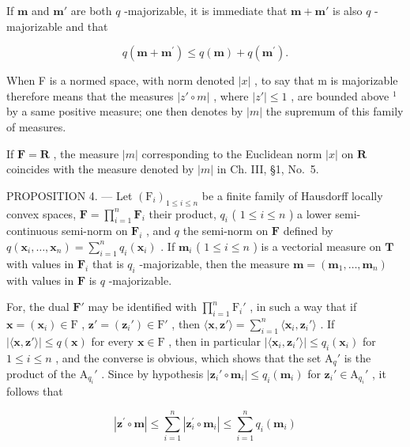 If \(\mathbf{m}\) and \(\mathbf{m}'\) are both \(q\) -majorizable, it is immediate that \(\mathbf{m} + \mathbf{m}'\) is also \(q\) -majorizable and that

\[
q (\mathbf {m} + \mathbf {m} ^ {\prime}) \leqslant q (\mathbf {m}) + q (\mathbf {m} ^ {\prime}).
\]

When F is a normed space, with norm denoted \(|x|\) , to say that m is majorizable therefore means that the measures \(|z'\circ m|\) , where \(|z'| \leqslant 1\) , are bounded above \(^{1}\) by a same positive measure; one then denotes by \(|m|\) the supremum of this family of measures.

If \(\mathbf{F} = \mathbf{R}\) , the measure \(|m|\) corresponding to the Euclidean norm \(|x|\) on \(\mathbf{R}\) coincides with the measure denoted by \(|m|\) in Ch. III, §1, No.~5.

PROPOSITION 4. --- Let \((\mathrm{F}_i)_{1 \leqslant i \leqslant n}\) be a finite family of Hausdorff locally convex spaces, \(\mathbf{F} = \prod_{i=1}^{n} \mathbf{F}_i\) their product, \(q_i\) ( \(1 \leqslant i \leqslant n\) ) a lower semi-continuous semi-norm on \(\mathbf{F}_i\) , and \(q\) the semi-norm on \(\mathbf{F}\) defined by \(q(\mathbf{x}_i, \ldots, \mathbf{x}_n) = \sum_{i=1}^{n} q_i(\mathbf{x}_i)\) . If \(\mathbf{m}_i\) ( \(1 \leqslant i \leqslant n\) ) is a vectorial measure on \(\mathbf{T}\) with values in \(\mathbf{F}_i\) that is \(q_i\) -majorizable, then the measure \(\mathbf{m} = (\mathbf{m}_1, \ldots, \mathbf{m}_n)\) with values in \(\mathbf{F}\) is \(q\) -majorizable.

For, the dual \(\mathbf{F}'\) may be identified with \(\prod_{i=1}^{n} \mathrm{F}_i'\) , in such a way that if \(\mathbf{x} = (\mathbf{x}_i) \in \mathrm{F}\) , \(\mathbf{z}' = (\mathbf{z}_i') \in \mathrm{F}'\) , then \(\langle \mathbf{x}, \mathbf{z}' \rangle = \sum_{i=1}^{n} \langle \mathbf{x}_i, \mathbf{z}_i' \rangle\) . If \(|\langle \mathbf{x}, \mathbf{z}' \rangle| \leqslant q(\mathbf{x})\) for every \(\mathbf{x} \in \mathrm{F}\) , then in particular \(|\langle \mathbf{x}_i, \mathbf{z}_i' \rangle| \leqslant q_i(\mathbf{x}_i)\) for \(1 \leqslant i \leqslant n\) , and the converse is obvious, which shows that the set \(\mathrm{A}_q'\) is the product of the \(\mathrm{A}_{q_i}'\) . Since by hypothesis \(|\mathbf{z}_i' \circ \mathbf{m}_i| \leqslant q_i(\mathbf{m}_i)\) for \(\mathbf{z}_i' \in \mathrm{A}_{q_i}'\) , it follows that

\[
\left| \mathbf {z} ^ {\prime} \circ \mathbf {m} \right| \leqslant \sum_ {i = 1} ^ {n} \left| \mathbf {z} _ {i} ^ {\prime} \circ \mathbf {m} _ {i} \right| \leqslant \sum_ {i = 1} ^ {n} q _ {i} (\mathbf {m} _ {i})
\]

